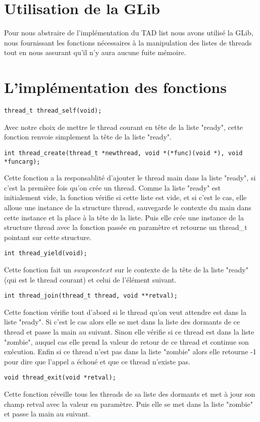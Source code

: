 \section {Utilisation de la GLib}

Pour nous abstraire de l'implémentation du TAD list nous avons utilisé
la GLib, nous fournissant les fonctions nécessaires à la manipulation
des listes de threads tout en nous assurant qu'il n'y aura aucune
fuite mémoire.

\section {L'implémentation des fonctions}

\begin{verbatim}
thread_t thread_self(void);
\end{verbatim}
Avec notre choix de mettre le thread courant en tête de la liste "ready",
cette fonction renvoie simplement la tête de la liste "ready".
~~\\
\begin{verbatim}
int thread_create(thread_t *newthread, void *(*func)(void *), void *funcarg);
\end{verbatim}


Cette fonction a la responsablité d'ajouter le thread main dans la
liste "ready", si c'est la première fois qu'on crée un thread.  Comme
la liste "ready" est initialement vide, la fonction vérifie si cette
liste est vide, et si c'est le cas, elle alloue une instance de la
structure thread, sauvegarde le contexte du main dans cette instance
et la place à la tête de la liste.  Puis elle crée une instance de la
structure thread avec la fonction passée en paramètre et retourne un
thread\_t pointant sur cette structure.  ~~\\
\begin{verbatim}
int thread_yield(void);
\end{verbatim}
Cette fonction fait un $swapcontext$ sur le contexte de la tête de la
liste "ready" (qui est le thread courant) et celui de l'élément
suivant.  ~~\\
\begin{verbatim}
int thread_join(thread_t thread, void **retval);
\end{verbatim}
Cette fonction vérifie tout d'abord si le thread qu'on veut attendre
est dans la liste "ready". Si c'est le cas alors elle se met dans la
liste des dormants de ce thread et passe la main au suivant.  Sinon
elle vérifie si ce thread est dans la liste "zombie", auquel cas
elle prend la valeur de retour de ce thread et continue son exécution.
Enfin si ce thread n'est pas dans la liste "zombie" alors elle
retourne -1 pour dire que l'appel a échoué et que ce thread n'existe
pas.  ~~\\
\begin{verbatim}
void thread_exit(void *retval);
\end{verbatim}
Cette fonction réveille tous les threads de sa liste des dormants et
met à jour son champ retval avec la valeur en paramètre. Puis elle se
met dans la liste "zombie" et passe la main au suivant.
